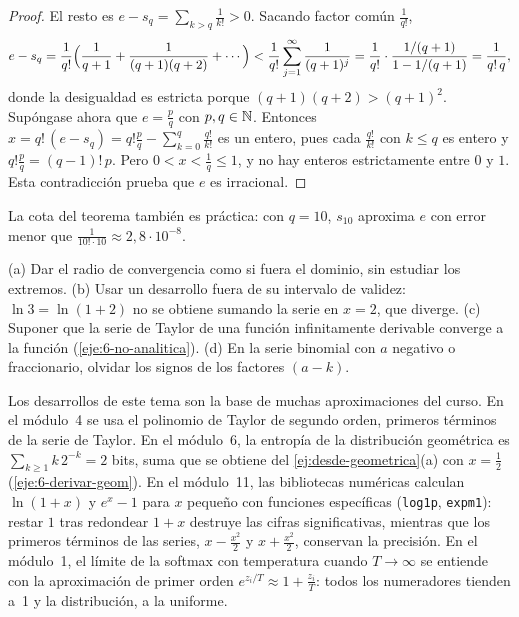 \begin{proof}
El resto es $e-s_q=\sum_{k>q}\frac{1}{k!}>0$. Sacando factor común $\frac{1}{q!}$,
\[
e-s_q=\frac{1}{q!}\Bigl(\frac{1}{q+1}+\frac{1}{(q+1)(q+2)}+\cdots\Bigr)<\frac{1}{q!}\sum_{j=1}^{\infty}\frac{1}{(q+1)^{j}}=\frac{1}{q!}\cdot\frac{1/(q+1)}{1-1/(q+1)}=\frac{1}{q!\,q},
\]
donde la desigualdad es estricta porque $(q+1)(q+2)>(q+1)^{2}$. Supóngase ahora que $e=\frac pq$ con $p,q\in\mathbb{N}$. Entonces $x=q!\,(e-s_q)=q!\frac pq-\sum_{k=0}^{q}\frac{q!}{k!}$ es un entero, pues cada $\frac{q!}{k!}$ con $k\le q$ es entero y $q!\frac pq=(q-1)!\,p$. Pero $0<x<\frac1q\le1$, y no hay enteros estrictamente entre $0$ y $1$. Esta contradicción prueba que $e$ es irracional.
\end{proof}

La cota del teorema también es práctica: con $q=10$, $s_{10}$ aproxima $e$ con error menor que $\frac{1}{10!\cdot10}\approx2{,}8\cdot10^{-8}$.

\begin{observacion}\label{obs:6-errores}
(a) Dar el radio de convergencia como si fuera el dominio, sin estudiar los extremos. (b) Usar un desarrollo fuera de su intervalo de validez: $\ln3=\ln(1+2)$ no se obtiene sumando la serie en $x=2$, que diverge. (c) Suponer que la serie de Taylor de una función infinitamente derivable converge a la función (\cref{eje:6-no-analitica}). (d) En la serie binomial con $a$ negativo o fraccionario, olvidar los signos de los factores $(a-k)$.
\end{observacion}

\begin{observacion}
Los desarrollos de este tema son la base de muchas aproximaciones del curso. En el módulo~4 se usa el polinomio de Taylor de segundo orden, primeros términos de la serie de Taylor. En el módulo~6, la entropía de la distribución geométrica es $\sum_{k\ge1}k\,2^{-k}=2$ bits, suma que se obtiene del \cref{ej:desde-geometrica}(a) con $x=\frac12$ (\cref{eje:6-derivar-geom}). En el módulo~11, las bibliotecas numéricas calculan $\ln(1+x)$ y $e^{x}-1$ para $x$ pequeño con funciones específicas (\texttt{log1p}, \texttt{expm1}): restar $1$ tras redondear $1+x$ destruye las cifras significativas, mientras que los primeros términos de las series, $x-\frac{x^{2}}{2}$ y $x+\frac{x^{2}}{2}$, conservan la precisión. En el módulo~1, el límite de la softmax con temperatura cuando $T\to\infty$ se entiende con la aproximación de primer orden $e^{z_i/T}\approx1+\frac{z_i}{T}$: todos los numeradores tienden a~1 y la distribución, a la uniforme.
\end{observacion}

